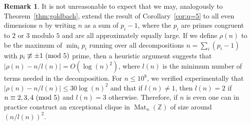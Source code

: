\documentclass{amsart}
\theoremstyle{plain}
\theoremstyle{definition}
\newtheorem{remark}[theorem]{Remark}
\DeclareMathOperator{\Mat}{Mat}
\newcommand{\Z}{\ensuremath{\mathbb{Z}}}
\begin{document}
\begin{remark}\label{rem:goldbach}
It is not unreasonable to expect that we may, analogously to Theorem~\ref{thm:goldbach}, extend the result of Corollary~\ref{cor:q=5} to all even dimensions \(n\) by writing \(n\) as a sum of \(p_i-1\), where the \(p_i\) are primes congruent to \(2\) or \(3\) modulo \(5\) and are all approximately equally large. 
If we define \(\rho(n)\) to be the maximum of \(\min_i p_i\) running over all decompositions \(n=\sum_i (p_i-1)\) with \(p_i\not\equiv \pm1\ (\textup{mod }5)\) prime, then a heuristic argument suggests that \(|\rho(n)-n/l(n)|=O(\log(n)^2)\), where \(l(n)\) is the minimum number of terms needed in the decomposition. For \(n\leq 10^8\), we verified experimentally that \(|\rho(n)-n/l(n)|\leq 30 \log(n)^2\) and that if \(l(n)\neq 1\), then \(l(n)=2\) if \(n\equiv 2,3,4\ (\textup{mod }5)\) and \(l(n)=3\) otherwise.
Therefore, if $n$ is even one can in practice construct an exceptional clique in $\Mat_n(\Z)$ of size around $(n/l(n))^2$.
\end{remark}


\end{document}
